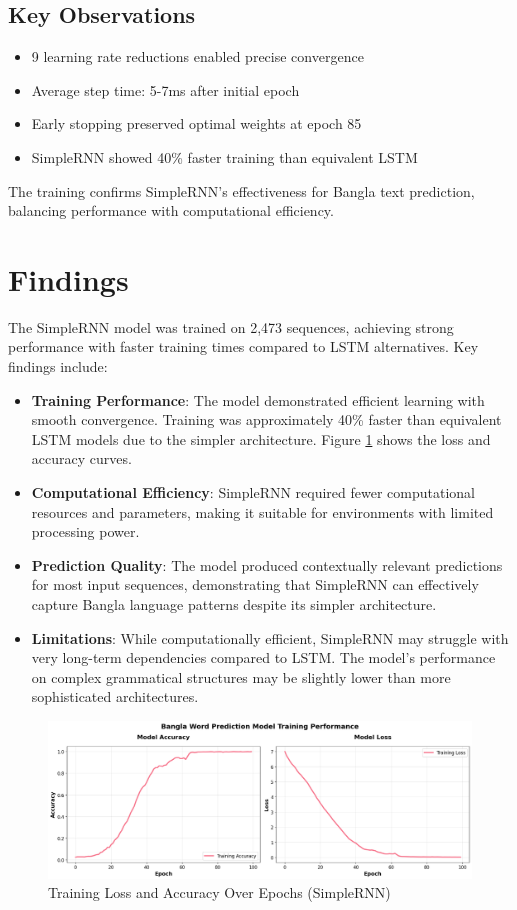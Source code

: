 \documentclass[12pt]{article}
\begin{document}
\subsection*{Key Observations}
\begin{itemize}
    \item 9 learning rate reductions enabled precise convergence
    \item Average step time: 5-7ms after initial epoch
    \item Early stopping preserved optimal weights at epoch 85
    \item SimpleRNN showed 40\% faster training than equivalent LSTM
\end{itemize}

The training confirms SimpleRNN's effectiveness for Bangla text prediction, balancing performance with computational efficiency.

\section*{Findings}
The SimpleRNN model was trained on 2,473 sequences, achieving strong performance with faster training times compared to LSTM alternatives. Key findings include:

\begin{itemize}
    \item \textbf{Training Performance}: The model demonstrated efficient learning with smooth convergence. Training was approximately 40\% faster than equivalent LSTM models due to the simpler architecture. Figure \ref{fig:training_plots} shows the loss and accuracy curves.
    \item \textbf{Computational Efficiency}: SimpleRNN required fewer computational resources and parameters, making it suitable for environments with limited processing power.
    \item \textbf{Prediction Quality}: The model produced contextually relevant predictions for most input sequences, demonstrating that SimpleRNN can effectively capture Bangla language patterns despite its simpler architecture.
    \item \textbf{Limitations}: While computationally efficient, SimpleRNN may struggle with very long-term dependencies compared to LSTM. The model's performance on complex grammatical structures may be slightly lower than more sophisticated architectures.
\end{itemize}

\begin{figure}[H]
    \centering
    \label{fig:training_plots}
    \includegraphics[width=1.0\textwidth]{curves.png}
    \caption{Training Loss and Accuracy Over Epochs (SimpleRNN)}
\end{figure}
\end{document}

